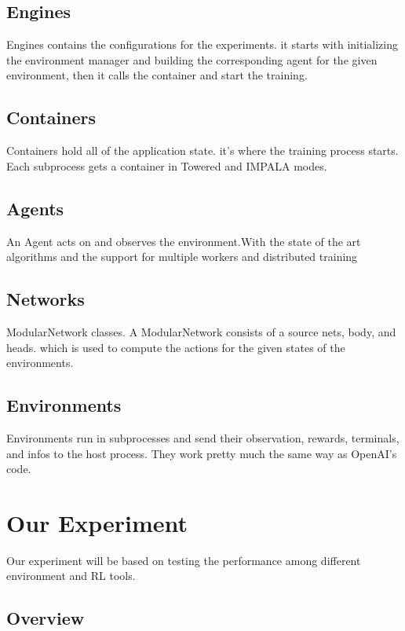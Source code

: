 \subsection{Engines}
Engines contains the configurations for the experiments. it starts with initializing the environment manager and building the corresponding agent for the given environment, then it calls the container and start the training. 

\subsection{Containers}
Containers hold all of the application state. it's where the training process starts. Each subprocess gets a container in Towered and IMPALA modes.

\subsection{Agents}
An Agent acts on and observes the environment.With the state of the art algorithms and the support for multiple workers and distributed training

\subsection{Networks}
ModularNetwork classes. A ModularNetwork consists of a source nets, body, and heads. which is used to compute the actions for the given states of the environments.

\subsection{Environments}
Environments run in subprocesses and send their observation, rewards, terminals, and infos to the host process. They work pretty much the same way as OpenAI's code.




\section{Our Experiment}
Our experiment will be based on testing the performance among different environment and RL tools.

\subsection{Overview} 

